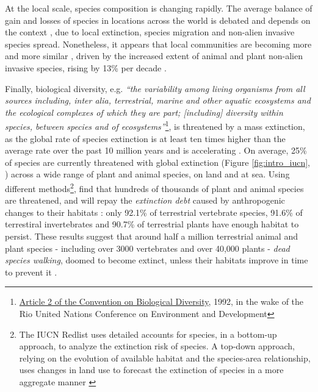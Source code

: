At the local scale, species composition is changing rapidly. The average balance of gain and losses of species in locations across the world is debated and depends on the context \citep{thomas_2013_local}, due to local extinction, species migration and non-alien invasive species spread. Nonetheless, it appears that local communities are becoming more and more similar \citep{mckinney_1999_biotic}, driven by the increased extent of animal and plant non-alien invasive species, rising by 13\% per decade \citep{seebens_no_2017}. 

Finally, biological diversity, e.g. \textit{``the variability among living organisms from all sources including, inter alia, terrestrial, marine and other aquatic ecosystems and the ecological complexes of which they are part; [including] diversity within species, between species and of ecosystems''}\footnote{\href{https://www.cbd.int/convention/articles/default.shtml?a=cbd-02}{ Article 2  of the Convention on Biological Diversity}, 1992, in the wake of the Rio United Nations Conference on Environment and Development },  is threatened by a mass extinction, as the global rate of species extinction is at least ten times higher than the average rate over the past 10 million years and is accelerating \citep{barnosky_has_2011, ceballos_accelerated_2015}. On average, 25\% of species are currently threatened with global extinction (Figure \ref{fig:intro_iucn}, \cite{IUCN_redlist_2024}) across a wide range of plant and animal species, on land and at sea. Using different methods\footnote{ The IUCN Redlist uses detailed accounts for species, in a bottom-up approach, to analyze the extinction risk of species. A top-down approach, relying on the evolution of available habitat and the species-area relationship, uses changes in land use to forecast the extinction of species in a more aggregate manner \citep{Diamond1972BiogeographicKE}}, \cite{Hoskins309377} find that hundreds of thousands of plant and animal species are threatened, and will repay the \textit{extinction debt} caused by anthropogenic changes to their habitats : only 92.1\% of terrestrial vertebrate species, 91.6\% of terrestiral invertebrates and 90.7\% of terrestrial plants have enough habitat to persist. These results suggest that around half a million terrestrial animal and plant species - including over 3000 vertebrates and over 40,000 plants - \textit{dead species walking}, doomed to become extinct, unless their habitats improve in time to prevent it \citep{ipbes_2022_6417333}.
 
